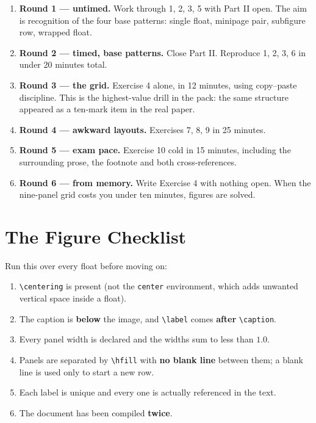 \documentclass[11pt]{article}
\begin{document}
\begin{enumerate}[leftmargin=*]
\item \textbf{Round 1 --- untimed.} Work through 1, 2, 3, 5 with Part II open.
  The aim is recognition of the four base patterns: single float, minipage pair,
  subfigure row, wrapped float.
\item \textbf{Round 2 --- timed, base patterns.} Close Part II. Reproduce
  1, 2, 3, 6 in under 20 minutes total.
\item \textbf{Round 3 --- the grid.} Exercise 4 alone, in 12 minutes, using
  copy--paste discipline. This is the highest-value drill in the pack: the same
  structure appeared as a ten-mark item in the real paper.
\item \textbf{Round 4 --- awkward layouts.} Exercises 7, 8, 9 in 25 minutes.
\item \textbf{Round 5 --- exam pace.} Exercise 10 cold in 15 minutes, including
  the surrounding prose, the footnote and both cross-references.
\item \textbf{Round 6 --- from memory.} Write Exercise 4 with nothing open. When
  the nine-panel grid costs you under ten minutes, figures are solved.
\end{enumerate}

\section*{The Figure Checklist}

Run this over every float before moving on:
\begin{enumerate}[label=\textbf{\arabic*.}, leftmargin=*]
\item \verb|\centering| is present (not the \texttt{center} environment, which
  adds unwanted vertical space inside a float).
\item The caption is \textbf{below} the image, and \verb|\label| comes
  \textbf{after} \verb|\caption|.
\item Every panel width is declared and the widths sum to less than $1.0$.
\item Panels are separated by \verb|\hfill| with \textbf{no blank line} between
  them; a blank line is used only to start a new row.
\item Each label is unique and every one is actually referenced in the text.
\item The document has been compiled \textbf{twice}.
\end{enumerate}
\end{document}
